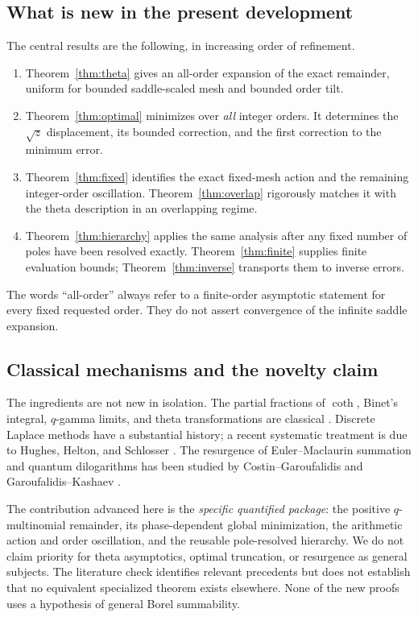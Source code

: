 \documentclass[11pt,a4paper]{article}
\numberwithin{equation}{section}
\theoremstyle{definition}\newtheorem{definition}[theorem]{Definition}
\theoremstyle{remark}\newtheorem{remark}[theorem]{Remark}
\begin{document}
\subsection{What is new in the present development}
The central results are the following, in increasing order of refinement.
\begin{enumerate}[label=(\roman*),leftmargin=2em]
\item Theorem~\ref{thm:theta} gives an all-order expansion of the exact
remainder, uniform for bounded saddle-scaled mesh and bounded order tilt.
\item Theorem~\ref{thm:optimal} minimizes over \emph{all} integer orders.
It determines the $\sqrt z$ displacement, its bounded correction, and the
first correction to the minimum error.
\item Theorem~\ref{thm:fixed} identifies the exact fixed-mesh action and the
remaining integer-order oscillation. Theorem~\ref{thm:overlap} rigorously
matches it with the theta description in an overlapping regime.
\item Theorem~\ref{thm:hierarchy} applies the same analysis after any fixed
number of poles have been resolved exactly. Theorem~\ref{thm:finite}
supplies finite evaluation bounds; Theorem~\ref{thm:inverse} transports them
to inverse errors.
\end{enumerate}
The words ``all-order'' always refer to a finite-order asymptotic statement
for every fixed requested order. They do not assert convergence of the
infinite saddle expansion.

\subsection{Classical mechanisms and the novelty claim}
The ingredients are not new in isolation. The partial fractions of $\coth$,
Binet's integral, $q$-gamma limits, and theta transformations are classical
\cite{dlmf-hyperbolic,dlmf-gamma,dlmf-qgamma,dlmf-theta}. Discrete Laplace
methods have a substantial history; a recent systematic treatment is due
to Hughes, Helton, and Schlosser \cite{discrete-laplace}. The resurgence of
Euler--Maclaurin summation and quantum dilogarithms has been studied by
Costin--Garoufalidis and Garoufalidis--Kashaev
\cite{costin-garoufalidis,garoufalidis-kashaev}.

The contribution advanced here is the \emph{specific quantified package}:
the positive $q$-multinomial remainder, its phase-dependent global
minimization, the arithmetic action and order oscillation, and the reusable
pole-resolved hierarchy. We do not claim priority for theta asymptotics,
optimal truncation, or resurgence as general subjects. The literature check
identifies relevant precedents but does not establish that no equivalent
specialized theorem exists elsewhere. None of the new proofs uses a
hypothesis of general Borel summability.
\end{document}
